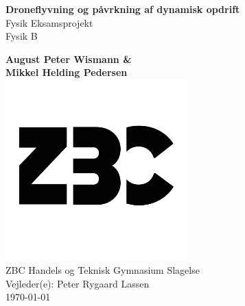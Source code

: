 \documentclass[11pt, a4paper]{report}
\begin{document}
    \begin{titlepage}
        \vspace*{1cm}
        \centering\huge{
            \textbf{Droneflyvning og påvrkning af dynamisk opdrift}} \\
        \vspace{0.2cm}
        \large{
            Fysik Eksamsprojekt\\}
        \small{Fysik B \\}

        \vspace{0.3cm}
        \large\textbf{August Peter Wismann \& \\ Mikkel Helding Pedersen} \\
        \vfill
        \includegraphics[height=7cm]{images/ZBC logo} \\
        \vfill
        ZBC Handels og Teknisk Gymnasium Slagelse \\
        Vejleder(e): Peter Rygaard Lassen  \\
        \today
    \end{titlepage}

    

    \tableofcontents
    
    
    
    
    
    




    \printbibliography[heading=bibintoc]\nocite{*}
    
\end{document}
